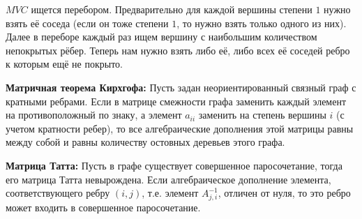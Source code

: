 $MVC$ ищется перебором. Предварительно для каждой вершины степени $1$ нужно взять её соседа (если он тоже степени $1$, то
нужно взять только одного из них). Далее в переборе каждый раз ищем вершину с наибольшим количеством непокрытых рёбер.
Теперь нам нужно взять либо её, либо всех её соседей ребро к которым ещё не покрыто.

\textbf{Матричная теорема Кирхгофа:}
Пусть задан неориентированный связный граф с кратными ребрами. Если в матрице смежности графа заменить каждый элемент на противоположный по знаку,
а элемент $a_{ii}$ заменить на степень вершины $i$ (с учетом кратности ребер), то все алгебраические дополнения этой матрицы равны между собой
и равны количеству остовных деревьев этого графа.

\textbf{Матрица Татта:}
Пусть в графе существует совершенное паросочетание, тогда его матрица Татта невырождена. Если алгебраическое дополнение элемента,
соответствующего ребру $(i, j)$, т.е. элемент $A_{j,i}^{-1}$, отличен от нуля, то это ребро может входить в совершенное паросочетание.

